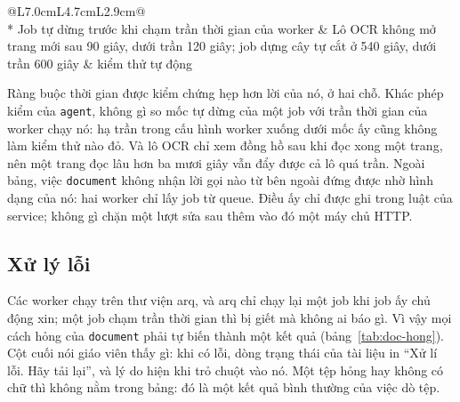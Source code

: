 \begin{longtable}{@{}L{7.0cm}L{4.7cm}L{2.9cm}@{}}
 \\*
\addlinespace
Job tự dừng trước khi chạm trần thời gian của worker & Lô OCR không mở trang mới sau 90 giây, dưới trần 120 giây; job dựng cây tự cắt ở 540 giây, dưới trần 600 giây & kiểm thử tự động \\
\end{longtable}

Ràng buộc thời gian được kiểm chứng hẹp hơn lời của nó, ở hai chỗ. Khác phép kiểm của
\texttt{agent}, không gì so mốc tự dừng của một job với trần thời gian của worker chạy nó: hạ trần
trong cấu hình worker xuống dưới mốc ấy cũng không làm kiểm thử nào đỏ. Và lô OCR chỉ xem đồng hồ
sau khi đọc xong một trang, nên một trang đọc lâu hơn ba mươi giây vẫn đẩy được cả lô quá trần.
Ngoài bảng, việc \texttt{document} không nhận lời gọi nào từ bên ngoài đứng được nhờ hình dạng của
nó: hai worker chỉ lấy job từ queue. Điều ấy chỉ được ghi trong luật của service; không gì chặn một
lượt sửa sau thêm vào đó một máy chủ HTTP.

\subsection{Xử lý lỗi}

Các worker chạy trên thư viện arq, và arq chỉ chạy lại một job khi job ấy chủ động xin; một job chạm
trần thời gian thì bị giết mà không ai báo gì. Vì vậy mọi cách hỏng của \texttt{document} phải tự
biến thành một kết quả (bảng~\ref{tab:doc-hong}). Cột cuối nói giáo viên thấy gì: khi có lỗi, dòng
trạng thái của tài liệu in ``Xử lí lỗi. Hãy tải lại'', và lý do hiện khi trỏ chuột vào nó. Một tệp
hỏng hay không có chữ thì không nằm trong bảng: đó là một kết quả bình thường của việc dò tệp.

